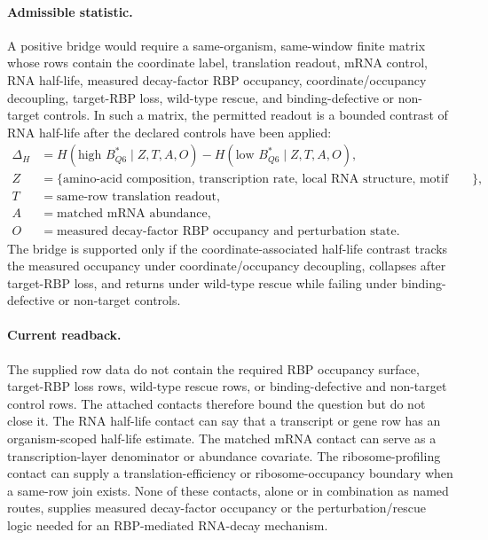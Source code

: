\paragraph{Admissible statistic.}
A positive bridge would require a same-organism, same-window finite matrix whose rows contain the coordinate label, translation readout, mRNA control, RNA half-life, measured decay-factor RBP occupancy, coordinate/occupancy decoupling, target-RBP loss, wild-type rescue, and binding-defective or non-target controls. In such a matrix, the permitted readout is a bounded contrast of RNA half-life after the declared controls have been applied:
$$
\begin{aligned}
\Delta_H
  &= H(\text{high } B^*_{Q6} \mid Z, T, A, O)
     - H(\text{low } B^*_{Q6} \mid Z, T, A, O), \\
Z
  &= \{\text{amino-acid composition, transcription rate, local RNA structure, motif density, GC, dinucleotide content, codon-pair context, splice or isoform state, batch}\}, \\
T
  &= \text{same-row translation readout}, \\
A
  &= \text{matched mRNA abundance}, \\
O
  &= \text{measured decay-factor RBP occupancy and perturbation state}.
\end{aligned}
$$
The bridge is supported only if the coordinate-associated half-life contrast tracks the measured occupancy under coordinate/occupancy decoupling, collapses after target-RBP loss, and returns under wild-type rescue while failing under binding-defective or non-target controls.

\paragraph{Current readback.}
The supplied row data do not contain the required RBP occupancy surface, target-RBP loss rows, wild-type rescue rows, or binding-defective and non-target control rows. The attached contacts therefore bound the question but do not close it. The RNA half-life contact can say that a transcript or gene row has an organism-scoped half-life estimate. The matched mRNA contact can serve as a transcription-layer denominator or abundance covariate. The ribosome-profiling contact can supply a translation-efficiency or ribosome-occupancy boundary when a same-row join exists. None of these contacts, alone or in combination as named routes, supplies measured decay-factor occupancy or the perturbation/rescue logic needed for an RBP-mediated RNA-decay mechanism.

